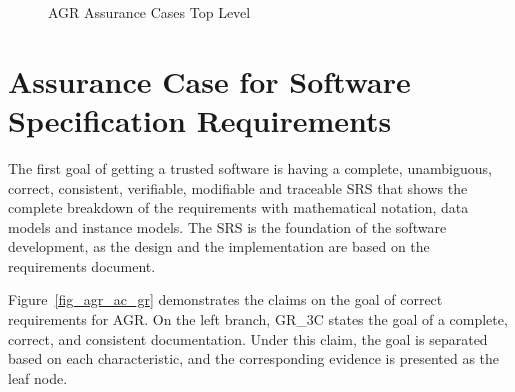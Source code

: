 \begin{figure}[hp]
    \centering
    \caption[AGR Assurance Cases Top Level]{AGR Assurance Cases Top Level}
    \label{fig_agr_ac_top}
\end{figure}


\section{Assurance Case for Software Specification Requirements}

The first goal of getting a trusted software is having a complete, unambiguous, correct, consistent, verifiable, modifiable and traceable SRS that shows the complete breakdown of the requirements with mathematical notation, data models and instance models. The SRS is the foundation of the software development, as the design and the implementation are based on the requirements document.

Figure~\ref{fig_agr_ac_gr} demonstrates the claims on the goal of correct requirements for AGR. On the left branch, GR\_3C states the goal of a complete, correct, and consistent documentation. Under this claim, the goal is separated based on each characteristic, and the corresponding evidence is presented as the leaf node.

